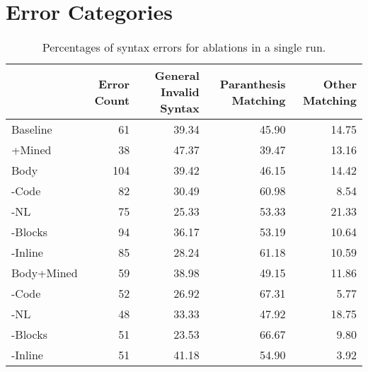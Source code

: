 \documentclass[11pt]{article}
\newcommand*{\tableind}{\hspace*{0.5cm}}\newcommand{\thincross}{\textrm{\ding{61}}}
\begin{document}
\section{Error Categories}\label{app:errorcats}
\begin{table*}[h!]
    \centering
 \begin{tabular}{l|r|rrr}
        \toprule
          &Error Count &  General Invalid Syntax &  Paranthesis Matching &  Other Matching \\
        \hline
        Baseline  &     61 &                   39.34 &                 45.90 &           14.75 \\
        \tableind +Mined &     38 &                   47.37 &                 39.47 &           13.16 \\
        \hline
        Body   &    104 &                   39.42 &                 46.15 &           14.42 \\
        \tableind -Code  &     82 &                   30.49 &                 60.98 &            8.54 \\
        \tableind -NL  &     75 &                   25.33 &                 53.33 &           21.33 \\
        \tableind -Blocks &     94 &                   36.17 &                 53.19 &           10.64 \\
        \tableind -Inline  &     85 &                   28.24 &                 61.18 &           10.59 \\
        \hline
        Body+Mined  &     59 &                   38.98 &                 49.15 &           11.86 \\
        \tableind -Code  &     52 &                   26.92 &                 67.31 &            5.77 \\
        \tableind -NL &     48 &                   33.33 &                 47.92 &           18.75 \\
        \tableind -Blocks &     51 &                   23.53 &                 66.67 &            9.80 \\
        \tableind -Inline &     51 &                   41.18 &                 54.90 &            3.92 \\
        \bottomrule
    \end{tabular}
    \caption{Percentages of syntax errors for ablations in a single run. }
    \label{tab:pctsyntax}
\end{table*}
\end{document}
